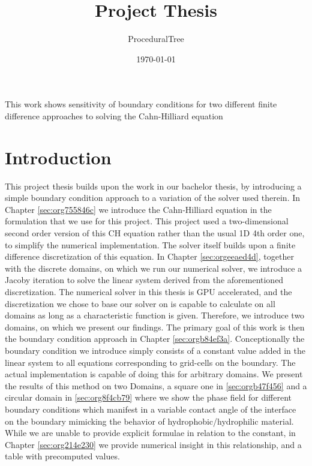 \documentclass{mimosis}
\author{ProceduralTree}
\date{\today}
\title{Project Thesis}
\newenvironment{abstract} {}{}
\begin{document}
\maketitle
\setcounter{tocdepth}{1}
\tableofcontents

\begin{abstract}
This work shows sensitivity of boundary conditions for two different finite difference approaches to solving the Cahn-Hilliard equation
\end{abstract}
\chapter{Introduction}
\label{sec:orgb38f6a5}
This project thesis builds upon the work in our bachelor thesis, by introducing a simple boundary condition approach to a variation of the solver used therein. In Chapter \ref{sec:org755846c} we introduce the Cahn-Hilliard equation in the formulation that we use for this project. This project used a two-dimensional second order version of this CH equation rather than the usual 1D 4th order one, to simplify the numerical implementation. The solver itself builds upon a finite difference discretization of this equation. In Chapter \ref{sec:orgeeaed4d}, together with the discrete domains, on which we run our numerical solver, we introduce a Jacoby iteration to solve the linear system derived from the aforementioned discretization.  The numerical solver in this thesis is GPU accelerated, and the discretization we chose to base our solver on is capable to calculate on all domains as long as a characteristic function is given. Therefore, we introduce two domains, on which we present our findings. The primary goal of this work is then the boundary condition approach in Chapter \ref{sec:orgb84ef3a}. Conceptionally the boundary condition we introduce simply consists of a constant value added in the linear system to all equations corresponding to grid-cells on the boundary. The actual implementation is capable of doing this for arbitrary domains. We present the results of this method on two Domains, a square one in \ref{sec:orgb47f456} and a circular domain in \ref{sec:org8f4cb79} where we show the phase field for different boundary conditions which manifest in a variable contact angle of the interface on the boundary mimicking the behavior of hydrophobic/hydrophilic material. While we are unable to provide explicit formulae in relation to the constant, in Chapter \ref{sec:org214e230} we provide numerical insight in this relationship, and a table with precomputed values.
\end{document}
